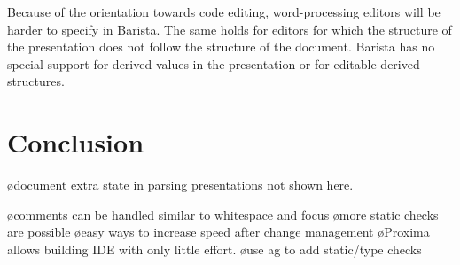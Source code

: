\documentclass[12pt]{article}
\begin{document}
Because of the orientation towards code editing, word-processing editors will be harder to specify in Barista. The same holds for editors for which the structure of the presentation does not follow the structure of the document. Barista has no special support for derived values in the presentation or for editable derived structures.

\ec



%
\section{Conclusion}\label{sect:conclusion}
%



\bc
\bl
\o document extra state in parsing presentations not shown here.
\el

\bl
\o comments can be handled similar to whitespace and focus
\o more static checks are possible
\o easy ways to increase speed after change management
\o Proxima allows building IDE with only little effort.
\o use ag to add static/type checks
\el
\ec


%



\end{document}
